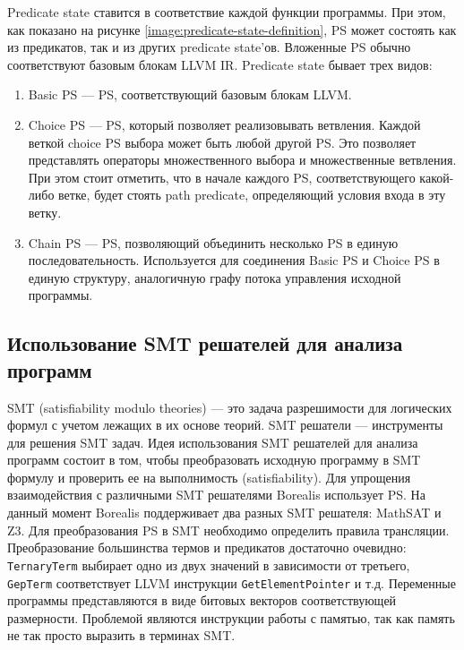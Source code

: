 Predicate state ставится в соответствие каждой функции программы. При этом, как показано на рисунке \ref{image:predicate-state-definition}, PS может состоять как из предикатов, так и из других predicate state'ов. Вложенные PS обычно соответствуют базовым блокам LLVM IR. Predicate state бывает трех видов:
\begin{enumerate}
\item Basic PS --- PS, соответствующий базовым блокам LLVM.
\item Choice PS --- PS, который позволяет реализовывать ветвления. Каждой веткой choice PS выбора может быть любой другой PS. Это позволяет представлять операторы множественного выбора и множественные ветвления. При этом стоит отметить, что в начале каждого PS, соответствующего какой-либо ветке, будет стоять path predicate, определяющий условия входа в эту ветку.
\item Chain PS --- PS, позволяющий объединить несколько PS в единую последовательность. Используется для соединения Basic PS и Choice PS в единую структуру, аналогичную графу потока управления исходной программы.
\end{enumerate}

\subsection{Использование SMT решателей для анализа программ}
SMT (satisfiability modulo theories) --- это задача разрешимости для логических формул с учетом лежащих в их основе теорий\cite{smt}. SMT решатели --- инструменты для решения SMT задач. Идея использования SMT решателей для анализа программ состоит в том, чтобы преобразовать исходную программу в SMT формулу и проверить ее на выполнимость (satisfiability). Для упрощения взаимодействия с различными SMT решателями Borealis использует PS. На данный момент Borealis поддерживает два разных SMT решателя: MathSAT\cite{mathsatsolver} и Z3. Для преобразования PS в SMT необходимо определить правила трансляции. Преобразование большинства термов и предикатов достаточно очевидно: \texttt{TernaryTerm} выбирает одно из двух значений в зависимости от третьего, \texttt{GepTerm} соответствует LLVM инструкции \texttt{GetElementPointer} и т.д. Переменные программы представляются в виде битовых векторов соответствующей размерности. Проблемой являются инструкции работы с памятью, так как память не так просто выразить в терминах SMT.

